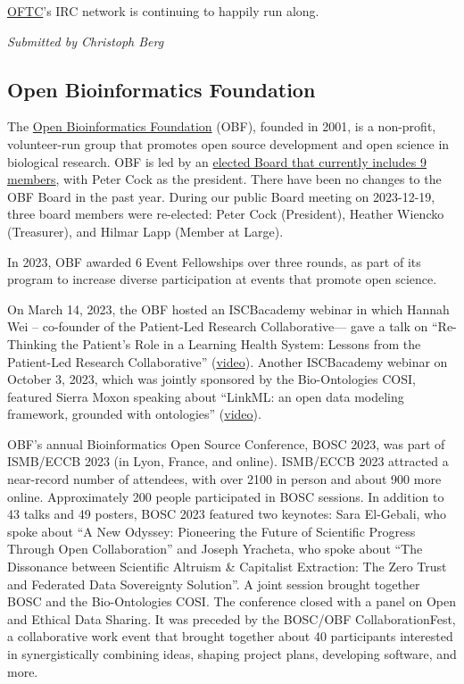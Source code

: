 \documentclass[a4paper]{report}
\begin{document}
\href{https://oftc.net/}{OFTC}'s IRC network is continuing to happily run along.

{\em Submitted by Christoph Berg}

\subsection{Open Bioinformatics Foundation}

The \href{https://www.open-bio.org/}{Open Bioinformatics Foundation} (OBF), founded in 2001, is a non-profit, volunteer-run group that promotes open source development and open science in biological research. OBF is led by an \href{https://open-bio.org/board/ }{elected Board that currently includes 9 members}, with Peter Cock as the president. There have been no changes to the OBF Board in the past year.  During our public Board meeting on 2023-12-19, three board members were re-elected: Peter Cock (President), Heather Wiencko (Treasurer), and Hilmar Lapp (Member at Large).

In 2023, OBF awarded 6 Event Fellowships over three rounds, as part of its program to increase diverse participation at events that promote open science.

On March 14, 2023, the OBF hosted an ISCBacademy webinar in which Hannah Wei -- co-founder of the Patient-Led Research Collaborative–-- gave a talk on ``Re-Thinking the Patient's Role in a Learning Health System: Lessons from the Patient-Led Research Collaborative'' (\href{https://youtu.be/M2vAotWKd_Q}{video}). Another ISCBacademy webinar on October 3, 2023, which was jointly sponsored by the Bio-Ontologies COSI, featured Sierra Moxon speaking about ``LinkML: an open data modeling framework, grounded with ontologies'' (\href{https://youtu.be/CwyncsMMdNA}{video}).

OBF's annual Bioinformatics Open Source Conference, BOSC 2023, was part of ISMB/ECCB 2023 (in Lyon, France, and online). ISMB/ECCB 2023 attracted a near-record number of attendees, with over 2100 in person and about 900 more online. Approximately 200 people participated in BOSC sessions. In addition to 43 talks and 49 posters, BOSC 2023 featured two keynotes: Sara El-Gebali, who spoke about ``A New Odyssey: Pioneering the Future of Scientific Progress Through Open Collaboration'' and Joseph Yracheta, who spoke about ``The Dissonance between Scientific Altruism \& Capitalist Extraction: The Zero Trust and Federated Data Sovereignty Solution''. A joint session brought together BOSC and the Bio-Ontologies COSI. The conference closed with a panel on Open and Ethical Data Sharing. It was preceded by the BOSC/OBF CollaborationFest, a collaborative work event that brought together about 40 participants interested in synergistically combining ideas, shaping project plans, developing software, and more.
\end{document}
